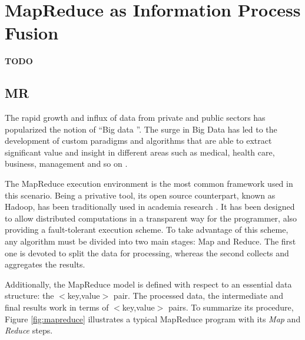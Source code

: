 \documentclass[3p,review]{elsarticle}
\newcommand{\TODO}{\textbf{TODO}}
\begin{document}
\section{MapReduce as Information Process Fusion}\label{sec:mr}


\TODO

\subsection{MR}\label{subsec:mr}

The rapid growth and influx of data from private and public sectors has popularized the notion of ``Big data \cite{Fer14}''. The surge in Big Data has led to the development of custom paradigms and algorithms that are able to extract significant value and insight in different areas such as medical, health care, business, management and so on \cite{Kam14,Chen14,wu14}.


The MapReduce execution environment \cite{Dea08} is the most common framework used in this scenario. Being a privative tool, its open source counterpart, known as Hadoop, has been traditionally used in academia research \cite{Whi15-Hadoop}. It has been designed to allow distributed computations in a transparent way for the programmer, also providing a fault-tolerant execution scheme. To take advantage of this scheme, any algorithm must be divided into two main stages: Map and Reduce. The first one is devoted to split the data for processing, whereas the second collects and aggregates the results.

Additionally, the MapReduce model is defined with respect to an essential data structure: the $<$key,value$>$ pair. The processed data, the intermediate and final results work in terms of $<$key,value$>$ pairs. To summarize its procedure, Figure \ref{fig:mapreduce} illustrates a typical MapReduce program with its \textit{Map} and \textit{Reduce} steps. %
\end{document}
